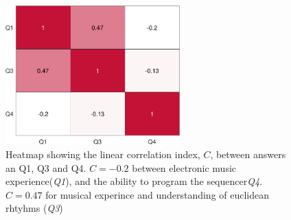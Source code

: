 \begin{figure}[H]
    \centering
    \includegraphics[width=0.6\textwidth]{graphics/hetmap_corr-crop.pdf}
    \caption{Heatmap showing the linear correlation index, $C$, between answers an Q1, Q3 and Q4. $C=-0.2$ between electronic music experience(\textit{Q1}), and the ability to program the sequencer\textit{Q4}. $C= 0.47$ for musical experince and understanding of euclidean rhtyhms (\textit{Q3})}
    \label{fig:corr}
\end{figure}







    
    
    
    
    
    
    

    
        
            
            

    
    
    
    